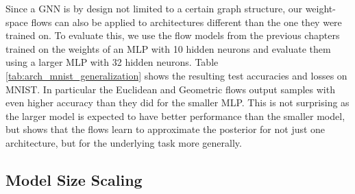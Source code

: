 Since a GNN is by design not limited to a certain graph structure, our weight-space flows can also be applied to architectures different than the one they were trained on. To evaluate this, we use the flow models from the previous chapters trained on the weights of an MLP with 10 hidden neurons and evaluate them using a larger MLP with 32 hidden neurons. Table \ref{tab:arch_mnist_generalization} shows the resulting test accuracies and losses on MNIST. In particular the Euclidean and Geometric flows output samples with even higher accuracy than they did for the smaller MLP. This is not surprising as the larger model is expected to have better performance than the smaller model, but shows that the flows learn to approximate the posterior for not just one architecture, but for the underlying task more generally. 

\subsection{Model Size Scaling} \label{sec:scaling}

